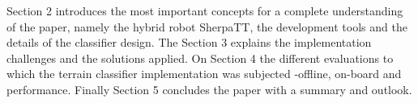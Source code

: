 Section 2 introduces the most important concepts for a complete understanding of the paper, namely the hybrid robot SherpaTT, the development tools and the details of the classifier design. 
The Section 3 explains the implementation challenges and the solutions applied. 
On Section 4 the different evaluations to which the terrain classifier implementation was subjected -offline, on-board and performance.
Finally Section 5 concludes the paper with a summary and outlook.